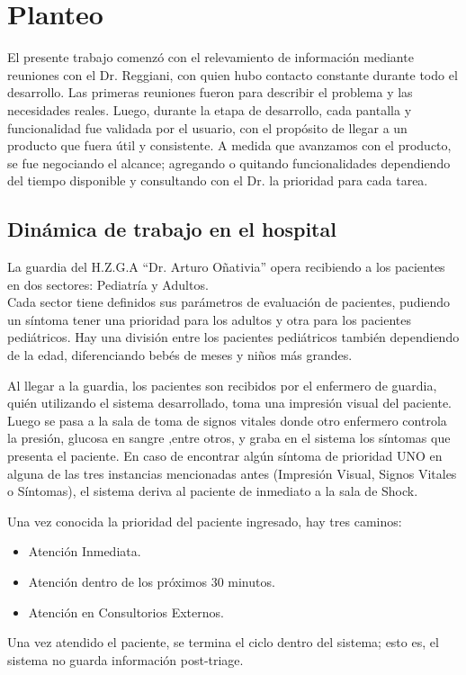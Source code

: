 \section{Planteo}

El presente trabajo comenzó con el relevamiento de información mediante reuniones con el Dr. Reggiani, con quien hubo contacto constante durante todo el desarrollo. Las primeras reuniones fueron para describir el problema y las necesidades reales. Luego, durante la etapa de desarrollo, cada pantalla y funcionalidad fue validada por el usuario, con el propósito de llegar a un producto que fuera útil y consistente. A medida que avanzamos con el producto, se fue negociando el alcance; agregando o quitando funcionalidades dependiendo del tiempo disponible y consultando con el Dr. la prioridad para cada tarea.


\subsection{Dinámica de trabajo en el hospital}
La guardia del H.Z.G.A ``Dr. Arturo Oñativia'' opera recibiendo a los pacientes en dos sectores: Pediatría y Adultos. \\
Cada sector tiene definidos sus parámetros de evaluación de pacientes, pudiendo un síntoma tener una prioridad para los adultos y otra para los pacientes pediátricos. Hay una división entre los pacientes pediátricos también dependiendo de la edad, diferenciando bebés de meses y niños más grandes.

Al llegar a la guardia, los pacientes son recibidos por el enfermero de guardia, quién utilizando el sistema desarrollado, toma una impresión visual del paciente. Luego se pasa a la sala de toma de signos vitales donde otro enfermero controla la presión, glucosa en sangre ,entre otros, y graba en el sistema los síntomas que presenta el paciente. En caso de encontrar algún síntoma de prioridad UNO en alguna de las tres instancias mencionadas antes (Impresión Visual, Signos Vitales o Síntomas), el sistema deriva al paciente de inmediato a la sala de Shock.  

Una vez conocida la prioridad del paciente ingresado, hay tres caminos: 
\begin{itemize}
\item Atención Inmediata.
\item Atención dentro de los próximos 30 minutos. 
\item Atención en Consultorios Externos.
\end{itemize}
Una vez atendido el paciente, se termina el ciclo dentro del sistema; esto es, el sistema no guarda información post-triage. \\



